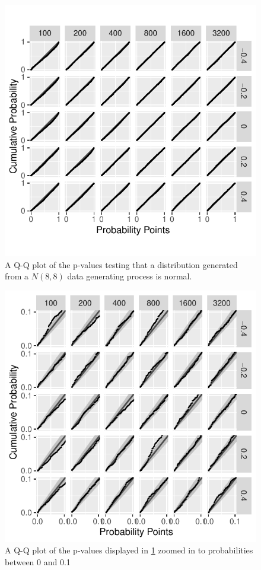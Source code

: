 \documentclass[12pt, letterpaper]{article}
\begin{document}
\begin{figure}[tbp]
  \centering
  \includegraphics[scale=1]{figures/normal}
  \caption{A Q-Q plot of the p-values testing that a distribution
  generated from a $N(8,8)$ data generating process is normal.}
  \label{fig:normal}
\end{figure}

\begin{figure}[tbp]
  \centering
  \includegraphics[scale=1]{figures/zoom_normal}
  \caption{A Q-Q plot of the p-values displayed in \ref{fig:normal} zoomed in to 
  probabilities between 0 and
  0.1}
  \label{fig:zoom_normal}
\end{figure}
\end{document}
